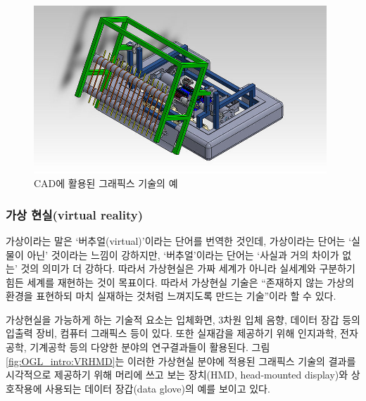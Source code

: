 \begin{figure}[h!]
  \centering
    \includegraphics[width=11cm]{OGL_intro/CAD.jpg}
    \caption{CAD에 활용된 그래픽스 기술의 예}
    \label{fig:OGL_intro:CAD}
\end{figure}


\subsubsection{가상 현실(virtual reality)}

가상이라는 말은 ‘버추얼(virtual)’이라는 단어를 번역한 것인데, 가상이라는 단어는 ‘실물이 아닌’ 것이라는 느낌이 강하지만, ‘버추얼’이라는 단어는 ‘사실과 거의 차이가 없는’ 것의 의미가 더 강하다. 따라서 가상현실은 가짜 세계가 아니라 실세계와 구분하기 힘든 세계를 재현하는 것이 목표이다. 따라서 가상현실 기술은 “존재하지 않는 가상의 환경을 표현하되 마치 실재하는 것처럼 느껴지도록 만드는 기술”이라 할 수 있다.

가상현실을 가능하게 하는 기술적 요소는 입체화면, 3차원 입체 음향, 데이터 장갑 등의 입출력 장비,  컴퓨터 그래픽스 등이 있다.  또한 실재감을 제공하기 위해 인지과학, 전자공학, 기계공학 등의 다양한 분야의 연구결과들이 활용된다. 그림 \ref{fig:OGL_intro:VRHMD}는 이러한 가상현실 분야에 적용된 그래픽스 기술의 결과를 시각적으로 제공하기 위해 머리에 쓰고 보는 장치(HMD, head-mounted display)와 상호작용에 사용되는 데이터 장갑(data glove)의 예를 보이고 있다.

